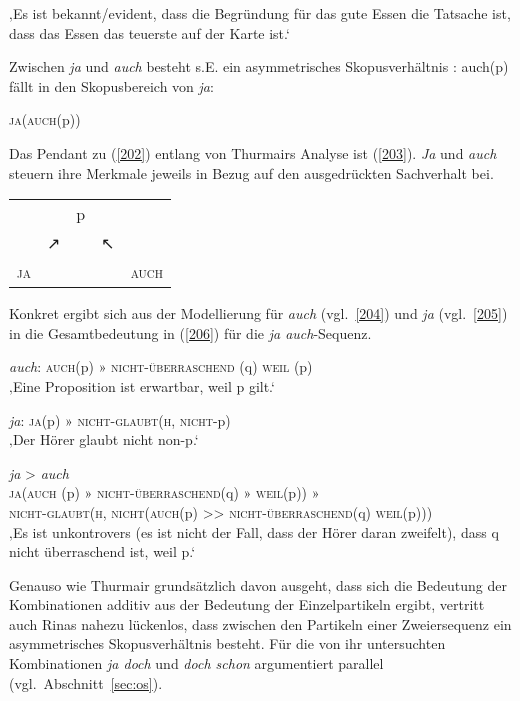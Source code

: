 \begin{exe}
	\ex\label{201} 
	‚Es ist bekannt/evident, dass die Begründung für das gute Essen die Tatsache ist, dass das Essen das teuerste auf der Karte ist.‘
\end{exe}				
Zwischen \textit{ja} und \textit{auch} besteht s.E. ein asymmetrisches Skopusverhältnis : auch(p) fällt in den Skopusbereich von \textit{ja}:

\begin{exe}
	\ex\label{202} 
	\textsc{ja}(\textsc{auch}(p))
\end{exe}
Das Pendant zu (\ref{202}) entlang von Thurmairs Analyse ist (\ref{203}). \textit{Ja} und \textit{auch} steuern ihre Merkmale jeweils in Bezug auf den ausgedrückten Sachverhalt bei.

\begin{exe}
\ex\label{203}
\begin{tabular}[t]{l@{}l@{}l@{}l@{}l@{}}
  	& & p & & \\
  	& ↗ & & ↖ &\\ 
  	\textsc{ja} & & & & \textsc{auch}\\
\end{tabular}
\end{exe}
Konkret ergibt sich aus der Modellierung für \textit{auch} (vgl.\ \ref{204}) und \textit{ja} (vgl.\ \ref{205}) in \citet{Rinas2007} die Gesamtbedeutung in (\ref{206}) für die \textit{ja auch}-Sequenz.

\begin{exe}
	\ex\label{204} 
			\textit{auch}: \textsc{auch}(p) » \textsc{nicht-überraschend} (q) \textsc{weil} (p)\\
			‚Eine Proposition ist erwartbar, weil p gilt.‘
\end{exe}

\begin{exe}
	\ex\label{205} 
			\textit{ja}: \textsc{ja}(p) » \textsc{nicht-glaubt}(\textsc{h}, \textsc{nicht}-p)\\
			‚Der Hörer glaubt nicht non-p.‘
\hfill\hbox{\citet[425/420]{Rinas2007}}			
\end{exe}
\begin{exe}
\ex\label{206}
	\textit{ja} > \textit{auch}\\
	\textsc{ja}(\textsc{auch} (p) » \textsc{nicht-überraschend}(q) » \textsc{weil}(p)) »\\
	\textsc{nicht-glaubt}(\textsc{h}, \textsc{nicht}(\textsc{auch}(p) >> \textsc{nicht-überraschend}(q) \textsc{weil}(p)))\\
	‚Es ist unkontrovers (es ist nicht der Fall, dass der Hörer daran zweifelt), dass q nicht überraschend ist, weil p.‘	
	\hfill\hbox{\citet[425]{Rinas2007}}
\end{exe}
Genauso wie Thurmair grundsätzlich davon ausgeht, dass sich die Bedeutung der Kombinationen additiv aus der Bedeutung der Einzelpartikeln ergibt, vertritt auch Rinas nahezu lückenlos, dass zwischen den Partikeln einer Zweiersequenz ein asymmetrisches Skopusverhältnis besteht. Für die von ihr untersuchten Kombinationen \textit{ja doch} und \textit{doch schon} argumentiert \citet{Ormelius-Sandblom1997} paral\-lel (vgl.\ Abschnitt~\ref{sec:os}). 

